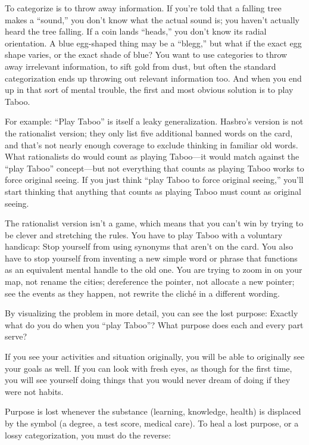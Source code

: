 {
 To categorize is to throw away information. If
you're told that a falling tree makes a
``sound,'' you don't
know what the actual sound is; you haven't actually
heard the tree falling. If a coin lands
``heads,'' you don't
know its radial orientation. A blue egg-shaped thing may be a
``blegg,'' but what if the exact egg
shape varies, or the exact shade of blue? You want to use categories to
throw away irrelevant information, to sift gold from dust, but often
the standard categorization ends up throwing out relevant information
too. And when you end up in that sort of mental trouble, the first and
most obvious solution is to play Taboo.}

{
 For example: ``Play Taboo'' is
itself a leaky generalization. Hasbro's version is not
the rationalist version; they only list five additional banned words on
the card, and that's not nearly enough coverage to
exclude thinking in familiar old words. What rationalists do would
count as playing Taboo---it would match against the
``play Taboo'' concept---but not
everything that counts as playing Taboo works to force original seeing.
If you just think ``play Taboo to force original
seeing,'' you'll start thinking that
anything that counts as playing Taboo must count as original seeing.}

{
 The rationalist version isn't a game, which means
that you can't win by trying to be clever and
stretching the rules. You have to play Taboo with a voluntary handicap:
Stop yourself from using synonyms that aren't on the
card. You also have to stop yourself from inventing a new simple word
or phrase that functions as an equivalent mental handle to the old one.
You are trying to zoom in on your map, not rename the cities;
dereference the pointer, not allocate a new pointer; see the events as
they happen, not rewrite the cliché in a different wording.}

{
 By visualizing the problem in more detail, you can see the lost
purpose: Exactly what do you do when you ``play
Taboo''? What purpose does each and every part
serve?}

{
 If you see your activities and situation originally, you will be
able to originally see your goals as well. If you can look with fresh
eyes, as though for the first time, you will see yourself doing things
that you would never dream of doing if they were not habits.}

{
 Purpose is lost whenever the substance (learning, knowledge,
health) is displaced by the symbol (a degree, a test score, medical
care). To heal a lost purpose, or a lossy categorization, you must do
the reverse:}

